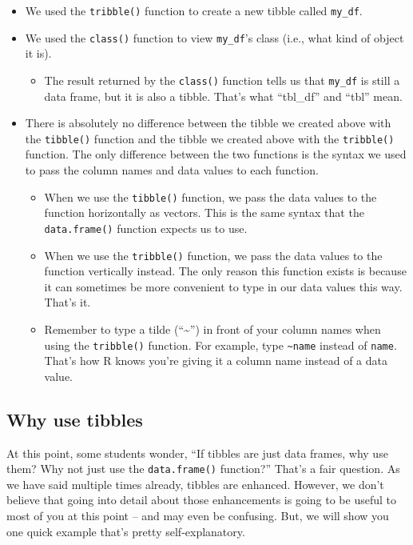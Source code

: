 \documentclass[
  letterpaper,
  DIV=11,
  numbers=noendperiod]{scrreprt}
\providecommand{\tightlist}{%
  \setlength{\itemsep}{0pt}\setlength{\parskip}{0pt}}\usepackage{longtable,booktabs,array}
\begin{document}
\begin{itemize}
\item
  We used the \texttt{tribble()} function to create a new tibble called
  \texttt{my\_df}.
\item
  We used the \texttt{class()} function to view \texttt{my\_df}'s class
  (i.e., what kind of object it is).

  \begin{itemize}
  \tightlist
  \item
    The result returned by the \texttt{class()} function tells us that
    \texttt{my\_df} is still a data frame, but it is also a tibble.
    That's what ``tbl\_df'' and ``tbl'' mean.
  \end{itemize}
\item
  There is absolutely no difference between the tibble we created above
  with the \texttt{tibble()} function and the tibble we created above
  with the \texttt{tribble()} function. The only difference between the
  two functions is the syntax we used to pass the column names and data
  values to each function.

  \begin{itemize}
  \item
    When we use the \texttt{tibble()} function, we pass the data values
    to the function horizontally as vectors. This is the same syntax
    that the \texttt{data.frame()} function expects us to use.
  \item
    When we use the \texttt{tribble()} function, we pass the data values
    to the function vertically instead. The only reason this function
    exists is because it can sometimes be more convenient to type in our
    data values this way. That's it.
  \item
    Remember to type a tilde (``\textasciitilde{}'') in front of your
    column names when using the \texttt{tribble()} function. For
    example, type \texttt{\textasciitilde{}name} instead of
    \texttt{name}. That's how R knows you're giving it a column name
    instead of a data value.
  \end{itemize}
\end{itemize}

\subsection{Why use tibbles}\label{why-use-tibbles}

At this point, some students wonder, ``If tibbles are just data frames,
why use them? Why not just use the \texttt{data.frame()} function?''
That's a fair question. As we have said multiple times already, tibbles
are enhanced. However, we don't believe that going into detail about
those enhancements is going to be useful to most of you at this point --
and may even be confusing. But, we will show you one quick example
that's pretty self-explanatory.
\end{document}
